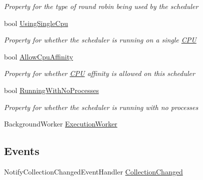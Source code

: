 \begin{DoxyCompactItemize}
\begin{DoxyCompactList}\small\item\em Property for the type of round robin being used by the scheduler \end{DoxyCompactList}\item 
bool \hyperlink{class_c_p_u___o_s___simulator_1_1_operating___system_1_1_scheduler_a3637999160bc25da430731042f42dd81}{Using\+Single\+Cpu}
\begin{DoxyCompactList}\small\item\em Property for whether the scheduler is running on a single \hyperlink{namespace_c_p_u___o_s___simulator_1_1_c_p_u}{C\+P\+U} \end{DoxyCompactList}\item 
bool \hyperlink{class_c_p_u___o_s___simulator_1_1_operating___system_1_1_scheduler_a904a19345a3ceffa809aac3e0ad06321}{Allow\+Cpu\+Affinity}
\begin{DoxyCompactList}\small\item\em Property for whether \hyperlink{namespace_c_p_u___o_s___simulator_1_1_c_p_u}{C\+P\+U} affinity is allowed on this scheduler \end{DoxyCompactList}\item 
bool \hyperlink{class_c_p_u___o_s___simulator_1_1_operating___system_1_1_scheduler_a17ad8e2a5da8823a25da6fa4190f532d}{Running\+With\+No\+Processes}
\begin{DoxyCompactList}\small\item\em Property for whether the scheduler is running with no processes \end{DoxyCompactList}\item 
Background\+Worker \hyperlink{class_c_p_u___o_s___simulator_1_1_operating___system_1_1_scheduler_a576004ed0b656a08a0d34d6b1b4d7f07}{Execution\+Worker}
\end{DoxyCompactItemize}
\subsection*{Events}
\begin{DoxyCompactItemize}
\item 
Notify\+Collection\+Changed\+Event\+Handler \hyperlink{class_c_p_u___o_s___simulator_1_1_operating___system_1_1_scheduler_a13cc271f1cf9b76d1cbc87988c45e1fb}{Collection\+Changed}
\end{DoxyCompactItemize}
